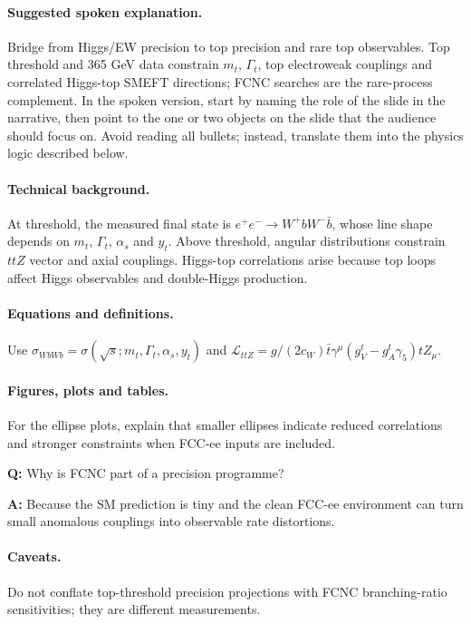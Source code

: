 \documentclass[11pt,a4paper]{report}
\newcommand{\ee}{e^+e^-}
\begin{document}
\paragraph{Suggested spoken explanation.}
Bridge from Higgs/EW precision to top precision and rare top observables. Top threshold and 365 GeV data constrain $m_t$, $\Gamma_t$, top electroweak couplings and correlated Higgs-top SMEFT directions; FCNC searches are the rare-process complement. In the spoken version, start by naming the role of the slide in the narrative, then point to the one or two objects on the slide that the audience should focus on.  Avoid reading all bullets; instead, translate them into the physics logic described below.

\paragraph{Technical background.}
At threshold, the measured final state is $\ee\to W^+bW^-\bar b$, whose line shape depends on $m_t$, $\Gamma_t$, $\alpha_s$ and $y_t$.  Above threshold, angular distributions constrain $ttZ$ vector and axial couplings.  Higgs-top correlations arise because top loops affect Higgs observables and double-Higgs production.

\paragraph{Equations and definitions.}
Use $\sigma_{WbWb}=\sigma(\sqrt{s};m_t,\Gamma_t,\alpha_s,y_t)$ and $\mathcal L_{ttZ}=g/(2c_W)\bar t\gamma^\mu(g_V^t-g_A^t\gamma_5)tZ_\mu$.

\paragraph{Figures, plots and tables.}
For the ellipse plots, explain that smaller ellipses indicate reduced correlations and stronger constraints when FCC-ee inputs are included.

\begin{questionbox}
\textbf{Q:} Why is FCNC part of a precision programme?\par
\textbf{A:} Because the SM prediction is tiny and the clean FCC-ee environment can turn small anomalous couplings into observable rate distortions.
\end{questionbox}

\paragraph{Caveats.}
Do not conflate top-threshold precision projections with FCNC branching-ratio sensitivities; they are different measurements.
\end{document}

